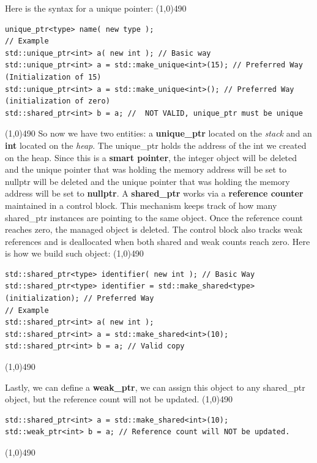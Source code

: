 \documentclass{report}
\begin{document}
    \pagebreak \bigbreak \noindent 
    Here is the syntax for a unique pointer:
    \bigbreak \noindent 
    \line(1,0){490}
    \begin{verbatim}
unique_ptr<type> name( new type );
// Example
std::unique_ptr<int> a( new int ); // Basic way 
std::unique_ptr<int> a = std::make_unique<int>(15); // Preferred Way (Initialization of 15)
std::unique_ptr<int> a = std::make_unique<int>(); // Preferred Way (initialization of zero)
std::shared_ptr<int> b = a; //  NOT VALID, unique_ptr must be unique
    \end{verbatim}
    \line(1,0){490}
    \bigbreak \noindent 
    So now we have two entities: a \textbf{unique\_ptr} located on the \textit{stack} and an \textbf{int} located on the \textit{heap}. The unique\_ptr holds the address of the int we created on the heap. Since this is a \textbf{smart pointer}, the integer object will be deleted and the unique pointer that was holding the memory address will be set to nullptr will be deleted and the unique pointer that was holding the memory address will be set to \textbf{nullptr}.
    \bigbreak \noindent 
    A \textbf{shared\_ptr} works via a \textbf{reference counter} maintained in a control block. This mechanism keeps track of how many shared\_ptr instances are pointing to the same object. Once the reference count reaches zero, the managed object is deleted. The control block also tracks weak references and is deallocated when both shared and weak counts reach zero. Here is how we build such object:
    \bigbreak \noindent 
    \line(1,0){490}
    \begin{verbatim}
std::shared_ptr<type> identifier( new int ); // Basic Way
std::shared_ptr<type> identifier = std::make_shared<type>(initialization); // Preferred Way
// Example
std::shared_ptr<int> a( new int );
std::shared_ptr<int> a = std::make_shared<int>(10);
std::shared_ptr<int> b = a; // Valid copy
    \end{verbatim}
    \line(1,0){490}

    \bigbreak \noindent 
    Lastly, we can define a \textbf{weak\_ptr}, we can assign this object to any shared\_ptr object, but the reference count will not be updated.
    \bigbreak \noindent 
    \line(1,0){490}
    \begin{verbatim}
std::shared_ptr<int> a = std::make_shared<int>(10);
std::weak_ptr<int> b = a; // Reference count will NOT be updated.
    \end{verbatim}
    \line(1,0){490}
\end{document}
